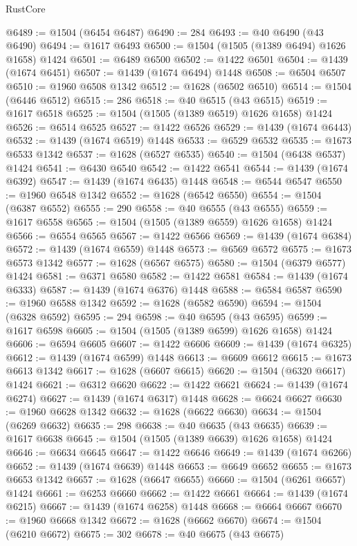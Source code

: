 \begin{lexlean}{RustCore}
\begin{coremodule}
@6489 := @1504 (@6454 @6487)
@6490 := 284
@6493 := @40 @6490 (@43 @6490)
@6494 := @1617 @6493
@6500 := @1504 (@1505 (@1389 @6494) @1626 @1658) @1424
@6501 := @6489 @6500
@6502 := @1422 @6501
@6504 := @1439 (@1674 @6451)
@6507 := @1439 (@1674 @6494) @1448
@6508 := @6504 @6507
@6510 := @1960 @6508 @1342
@6512 := @1628 (@6502 @6510)
@6514 := @1504 (@6446 @6512)
@6515 := 286
@6518 := @40 @6515 (@43 @6515)
@6519 := @1617 @6518
@6525 := @1504 (@1505 (@1389 @6519) @1626 @1658) @1424
@6526 := @6514 @6525
@6527 := @1422 @6526
@6529 := @1439 (@1674 @6443)
@6532 := @1439 (@1674 @6519) @1448
@6533 := @6529 @6532
@6535 := @1673 @6533 @1342
@6537 := @1628 (@6527 @6535)
@6540 := @1504 (@6438 @6537) @1424
@6541 := @6430 @6540
@6542 := @1422 @6541
@6544 := @1439 (@1674 @6392)
@6547 := @1439 (@1674 @6435) @1448
@6548 := @6544 @6547
@6550 := @1960 @6548 @1342
@6552 := @1628 (@6542 @6550)
@6554 := @1504 (@6387 @6552)
@6555 := 290
@6558 := @40 @6555 (@43 @6555)
@6559 := @1617 @6558
@6565 := @1504 (@1505 (@1389 @6559) @1626 @1658) @1424
@6566 := @6554 @6565
@6567 := @1422 @6566
@6569 := @1439 (@1674 @6384)
@6572 := @1439 (@1674 @6559) @1448
@6573 := @6569 @6572
@6575 := @1673 @6573 @1342
@6577 := @1628 (@6567 @6575)
@6580 := @1504 (@6379 @6577) @1424
@6581 := @6371 @6580
@6582 := @1422 @6581
@6584 := @1439 (@1674 @6333)
@6587 := @1439 (@1674 @6376) @1448
@6588 := @6584 @6587
@6590 := @1960 @6588 @1342
@6592 := @1628 (@6582 @6590)
@6594 := @1504 (@6328 @6592)
@6595 := 294
@6598 := @40 @6595 (@43 @6595)
@6599 := @1617 @6598
@6605 := @1504 (@1505 (@1389 @6599) @1626 @1658) @1424
@6606 := @6594 @6605
@6607 := @1422 @6606
@6609 := @1439 (@1674 @6325)
@6612 := @1439 (@1674 @6599) @1448
@6613 := @6609 @6612
@6615 := @1673 @6613 @1342
@6617 := @1628 (@6607 @6615)
@6620 := @1504 (@6320 @6617) @1424
@6621 := @6312 @6620
@6622 := @1422 @6621
@6624 := @1439 (@1674 @6274)
@6627 := @1439 (@1674 @6317) @1448
@6628 := @6624 @6627
@6630 := @1960 @6628 @1342
@6632 := @1628 (@6622 @6630)
@6634 := @1504 (@6269 @6632)
@6635 := 298
@6638 := @40 @6635 (@43 @6635)
@6639 := @1617 @6638
@6645 := @1504 (@1505 (@1389 @6639) @1626 @1658) @1424
@6646 := @6634 @6645
@6647 := @1422 @6646
@6649 := @1439 (@1674 @6266)
@6652 := @1439 (@1674 @6639) @1448
@6653 := @6649 @6652
@6655 := @1673 @6653 @1342
@6657 := @1628 (@6647 @6655)
@6660 := @1504 (@6261 @6657) @1424
@6661 := @6253 @6660
@6662 := @1422 @6661
@6664 := @1439 (@1674 @6215)
@6667 := @1439 (@1674 @6258) @1448
@6668 := @6664 @6667
@6670 := @1960 @6668 @1342
@6672 := @1628 (@6662 @6670)
@6674 := @1504 (@6210 @6672)
@6675 := 302
@6678 := @40 @6675 (@43 @6675)

\end{coremodule}
\end{lexlean}
